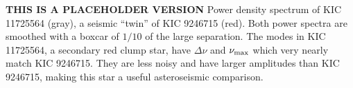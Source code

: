 \label{fig:twin}
\textbf{THIS IS A PLACEHOLDER VERSION} Power density spectrum of KIC 11725564 (gray), a seismic ``twin'' of KIC 9246715 (red). Both power spectra are smoothed with a boxcar of $1/10$ of the large separation. The modes in KIC 11725564, a secondary red clump star, have $\Delta \nu$ and $\nu_{\rm{max}}$ which very nearly match KIC 9246715. They are less noisy and have larger amplitudes than KIC 9246715, making this star a useful asteroseismic comparison.